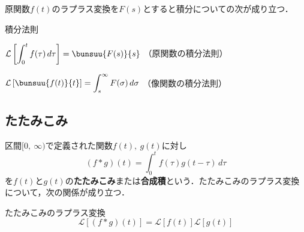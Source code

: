 原関数$f(t)$のラプラス変換を$F(s)$とすると積分についての次が成り立つ．

\begin{kousiki}{積分法則}
	\begin{enumerate}[label=\textbf{[\arabic*]}, labelsep=10pt, leftmargin=23pt]
		\item $\mathcal{L}\left[\dint_{0}^{t} f(\tau)\,d\tau\right] = \bunsuu{F(s)}{s}$ \hfill （原関数の積分法則）
		\item $\mathcal{L}\left[\bunsuu{f(t)}{t}\right] = \dint_{s}^{\infty} F(\sigma)\,d\sigma$ \hfill （像関数の積分法則）
	\end{enumerate}
\end{kousiki}



\subsection{たたみこみ}

区間$[0,\ \infty)$で定義された関数$f(t),\ g(t)$に対し
\begin{equation}
	(f * g)(t) = \int_{0}^{t} f(\tau)g(t - \tau)\,d\tau
\end{equation}
を$f(t)$と$g(t)$の\textbf{たたみこみ}または\textbf{合成積}という．たたみこみのラプラス変換について，次の関係が成り立つ．
\begin{kousiki}{たたみこみのラプラス変換}
	\begin{equation}
		\mathcal{L}[(f * g)(t)] = \mathcal{L}[f(t)]\mathcal{L}[g(t)]
	\end{equation}
\end{kousiki}